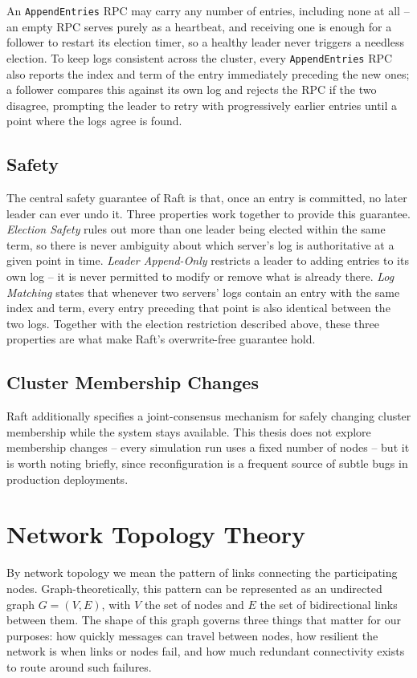 An \texttt{AppendEntries} RPC may carry any number of entries, including none at all -- an empty RPC serves purely as a heartbeat, and receiving one is enough for a follower to restart its election timer, so a healthy leader never triggers a needless election. To keep logs consistent across the cluster, every \texttt{AppendEntries} RPC also reports the index and term of the entry immediately preceding the new ones; a follower compares this against its own log and rejects the RPC if the two disagree, prompting the leader to retry with progressively earlier entries until a point where the logs agree is found.

\subsection{Safety}

The central safety guarantee of Raft is that, once an entry is committed, no later leader can ever undo it. Three properties work together to provide this guarantee. \emph{Election Safety} rules out more than one leader being elected within the same term, so there is never ambiguity about which server's log is authoritative at a given point in time. \emph{Leader Append-Only} restricts a leader to adding entries to its own log -- it is never permitted to modify or remove what is already there. \emph{Log Matching} states that whenever two servers' logs contain an entry with the same index and term, every entry preceding that point is also identical between the two logs. Together with the election restriction described above, these three properties are what make Raft's overwrite-free guarantee hold.

\subsection{Cluster Membership Changes}

Raft additionally specifies a joint-consensus mechanism for safely changing cluster membership while the system stays available. This thesis does not explore membership changes -- every simulation run uses a fixed number of nodes -- but it is worth noting briefly, since reconfiguration is a frequent source of subtle bugs in production deployments.

\section{Network Topology Theory}

By network topology we mean the pattern of links connecting the participating nodes. Graph-theoretically, this pattern can be represented as an undirected graph $G = (V, E)$, with $V$ the set of nodes and $E$ the set of bidirectional links between them. The shape of this graph governs three things that matter for our purposes: how quickly messages can travel between nodes, how resilient the network is when links or nodes fail, and how much redundant connectivity exists to route around such failures.

